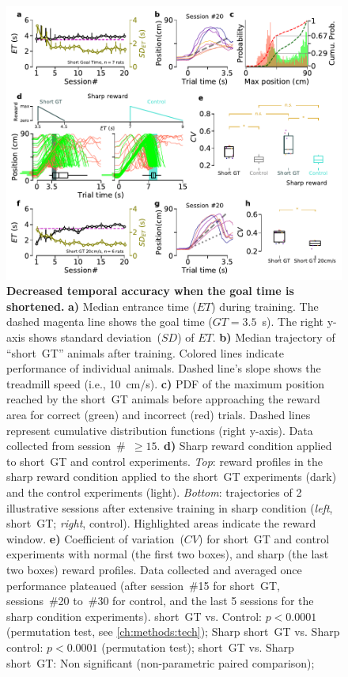 \begin{figure}[!bt]
  \begin{center}
    \includegraphics[width=.6\linewidth]{ch-time/figures/ShortGT-SharpTrd.pdf}
    \caption[short~GT and Sharp Reward Conditions]
    {\textbf{Decreased temporal accuracy when the goal time is shortened.}
    \textbf{a)}
    Median entrance time ($ET$) during training.
    The dashed magenta line shows the goal time ($GT=3.5$~s).
    The right y-axis shows standard deviation~($SD$) of $ET$.
    \textbf{b)}
    Median trajectory of ``short~GT'' animals after training.
    Colored lines indicate performance of individual animals.
    Dashed line's slope shows the treadmill speed (i.e., 10~cm/s).
    \textbf{c)}
    PDF of the maximum position reached by the short~GT animals before approaching the reward area for correct (green) and incorrect (red) trials.
    Dashed lines represent cumulative distribution functions (right y-axis).
    Data collected from session~\#~$\geq15$.
    \textbf{d)} 
    Sharp reward condition applied to short~GT and control experiments.
    \textit{Top}: reward profiles in the sharp reward condition applied to the short~GT experiments (dark) and the control experiments (light).
    \textit{Bottom}: trajectories of 2 illustrative sessions after extensive training in sharp condition (\textit{left}, short~GT; \textit{right}, control).
    Highlighted areas indicate the reward window.
    \textbf{e)}
    Coefficient of variation~($CV$) for short~GT and control experiments with normal (the first two boxes), and sharp (the last two boxes) reward profiles.
    Data collected and averaged once performance plateaued (after session~\#15 for short~GT, sessions~\#20 to~\#30 for control, and the last 5 sessions for the sharp condition experiments).
    short~GT vs. Control: $p<0.0001$ (permutation test, see \autoref{ch:methods:tech});
    Sharp short~GT vs. Sharp control: $p<0.0001$ (permutation test);
    short~GT vs. Sharp short~GT: Non significant (non-parametric paired comparison); 
}
\end{center}
\end{figure}
